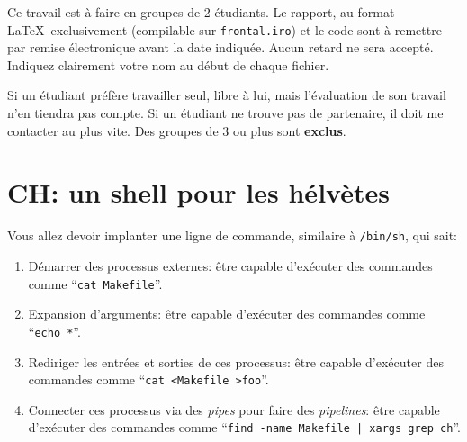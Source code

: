\documentclass{article}
\begin{document}
Ce travail est à faire en groupes de 2 étudiants.  Le rapport, au format
\LaTeX\ exclusivement (compilable sur \texttt{frontal.iro}) et le code sont
à remettre par remise électronique avant la date indiquée.  Aucun retard ne
sera accepté.  Indiquez clairement votre nom au début de chaque fichier.

Si un étudiant préfère travailler seul, libre à lui, mais l'évaluation de
son travail n'en tiendra pas compte.  Si un étudiant ne trouve pas de
partenaire, il doit me contacter au plus vite.  Des groupes de 3 ou plus
sont \textbf{exclus}.

\newpage
\section{CH: un shell pour les hélvètes}

Vous allez devoir implanter une ligne de commande, similaire
à \texttt{/bin/sh}, qui sait:
\begin{enumerate}
\item Démarrer des processus externes: être capable d'exécuter des commandes
  comme ``\texttt{cat Makefile}''.
\item Expansion d'arguments: être capable d'exécuter des commandes comme
  ``\texttt{echo *}''.
\item Rediriger les entrées et sorties de ces processus: être capable
  d'exécuter des commandes comme ``\texttt{cat <Makefile >foo}''.
\item Connecter ces processus via des \emph{pipes} pour faire des
  \emph{pipelines}: être capable d'exécuter des commandes comme
  ``\texttt{find -name Makefile | xargs grep ch}''.
\end{enumerate}
\end{document}
